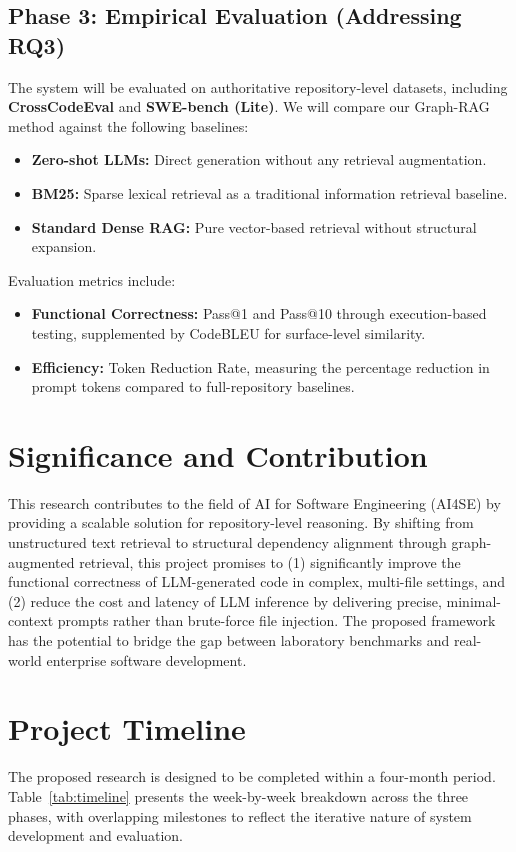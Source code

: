 \documentclass[11pt, a4paper]{article}
\begin{document}
\subsection{Phase 3: Empirical Evaluation (Addressing RQ3)}
The system will be evaluated on authoritative repository-level datasets, including \textbf{CrossCodeEval} and \textbf{SWE-bench (Lite)}. We will compare our Graph-RAG method against the following baselines:
\begin{itemize}
    \item \textbf{Zero-shot LLMs:} Direct generation without any retrieval augmentation.
    \item \textbf{BM25:} Sparse lexical retrieval as a traditional information retrieval baseline.
    \item \textbf{Standard Dense RAG:} Pure vector-based retrieval without structural expansion.
\end{itemize}
Evaluation metrics include:
\begin{itemize}
    \item \textbf{Functional Correctness:} Pass@1 and Pass@10 through execution-based testing, supplemented by CodeBLEU for surface-level similarity.
    \item \textbf{Efficiency:} Token Reduction Rate, measuring the percentage reduction in prompt tokens compared to full-repository baselines.
\end{itemize}

\section{Significance and Contribution}
This research contributes to the field of AI for Software Engineering (AI4SE) by providing a scalable solution for repository-level reasoning. By shifting from unstructured text retrieval to structural dependency alignment through graph-augmented retrieval, this project promises to (1) significantly improve the functional correctness of LLM-generated code in complex, multi-file settings, and (2) reduce the cost and latency of LLM inference by delivering precise, minimal-context prompts rather than brute-force file injection. The proposed framework has the potential to bridge the gap between laboratory benchmarks and real-world enterprise software development.
\section{Project Timeline}
The proposed research is designed to be completed within a four-month period. Table~\ref{tab:timeline} presents the week-by-week breakdown across the three phases, with overlapping milestones to reflect the iterative nature of system development and evaluation.
\end{document}
